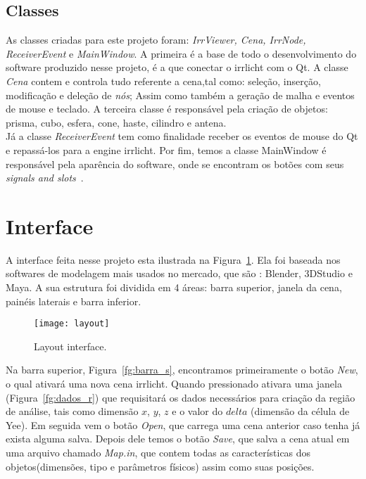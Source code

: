 \subsection{Classes}
As classes criadas para este projeto foram: \textit{IrrViewer, Cena, IrrNode, ReceiverEvent} e \textit{MainWindow}. A primeira é a base de todo o desenvolvimento do software produzido nesse projeto, é a que conectar o irrlicht com o Qt. A classe \textit{Cena} contem e controla tudo referente a cena,tal como: seleção, inserção, modificação e deleção de \textit{nós}; Assim como também a geração de malha e eventos de mouse e teclado. A terceira classe é responsável pela criação de objetos: prisma, cubo, esfera, cone, haste, cilindro e antena.\\

Já a classe \textit{ReceiverEvent} tem como finalidade receber os eventos de mouse do Qt e repassá-los para a engine irrlicht. Por fim, temos a classe MainWindow é responsável pela aparência do software, onde se encontram os botões com seus \textit{signals and slots}~\cite{qt}.

\section{Interface}
A interface feita nesse projeto esta ilustrada na Figura~\ref{fg:layout}. Ela foi baseada nos softwares de modelagem mais usados no mercado, que são : Blender, 3DStudio e Maya. A sua estrutura foi dividida em 4 áreas: barra superior, janela da cena, painéis laterais e barra inferior.\\

\begin{figure}[ht!]
	\centering
	\texttt{[image: layout]}
	\caption{Layout interface.}
	\label{fg:layout}
\end{figure}

Na barra superior, Figura~\ref{fg:barra_s}, encontramos primeiramente o botão \textit{New}, o qual ativará uma nova cena irrlicht. Quando pressionado ativara uma janela (Figura~\ref{fg:dados_r}) que requisitará os dados necessários para criação da região de análise, tais como dimensão $x$, $y$, $z$ e o valor do $delta$ (dimensão da célula de Yee). Em seguida vem o botão \textit{Open}, que carrega uma cena anterior caso tenha já exista alguma salva. Depois dele temos o botão \textit{Save}, que salva a cena atual em uma arquivo chamado \textit{Map.in}, que contem todas as características dos objetos(dimensões, tipo e parâmetros físicos) assim como suas posições.\\

